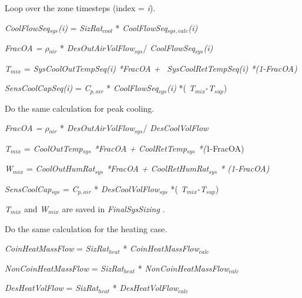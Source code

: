 \begin{enumerate}
\def\labelenumi{(\roman{enumi})}
\setcounter{enumi}{1}
\tightlist
{\setlength\itemindent{25pt} \item Loop over the zone timesteps (index = \emph{i}).}
\end{enumerate}

\emph{CoolFlowSeq\(_{sys}\)(i)} = \emph{SizRat\(_{cool}\)} * \emph{CoolFlowSeq\(_{sys,calc}\)(i)}

\emph{FracOA = $\rho$\(_{air}\)} * \emph{DesOutAirVolFlow\(_{sys}\)}/ \emph{CoolFlowSeq\(_{sys}\)(i)}

\emph{T\(_{mix}\)} = \emph{SysCoolOutTempSeq(i) *FracOA +~} \emph{SysCoolRetTempSeq(i) *(1-FracOA)}

\emph{SensCoolCapSeq(i)} = \emph{C\(_{p,air}\)} * \emph{CoolFlowSeq\(_{sys}\)(i)} *( \emph{T\(_{mix}\)}-\emph{T\(_{sup}\)})

\begin{enumerate}
\def\labelenumi{(\roman{enumi})}
\setcounter{enumi}{2}
\tightlist
{\setlength\itemindent{25pt} \item Do the same calculation for peak cooling.}
\end{enumerate}

\emph{FracOA = $\rho$\(_{air}\)} * \emph{DesOutAirVolFlow\(_{sys}\)}/ \emph{DesCoolVolFlow}

\emph{T\(_{mix}\)} = \emph{CoolOutTemp\(_{sys}\) *FracOA + CoolRetTemp\(_{sys}\) *(}1-FracOA)

\emph{W\(_{mix}\)} = \emph{CoolOutHumRat\(_{sys}\) *FracOA + CoolRetHumRat\(_{sys}\) * (1-FracOA)}

\emph{SensCoolCap\(_{sys}\)} = \emph{C\(_{p,air}\)} * \emph{DesCoolVolFlow\(_{sys}\)} *( \emph{T\(_{mix}\)}-\emph{T\(_{sup}\)})

\emph{T\(_{mix}\)} and \emph{W\(_{mix}\)} are saved in \emph{FinalSysSizing} \emph{.}

\begin{enumerate}
\def\labelenumi{(\roman{enumi})}
\setcounter{enumi}{3}
\tightlist
{\setlength\itemindent{25pt} \item Do the same calculation for the heating case.}
\end{enumerate}

\emph{CoinHeatMassFlow} = \emph{SizRat\(_{heat}\)} * \emph{CoinHeatMassFlow\(_{calc}\)}

\emph{NonCoinHeatMassFlow} = \emph{SizRat\(_{heat}\)} * \emph{NonCoinHeatMassFlow\(_{calc}\)}

\emph{DesHeatVolFlow} = \emph{SizRat\(_{heat}\)} * \emph{DesHeatVolFlow\(_{calc}\)}

